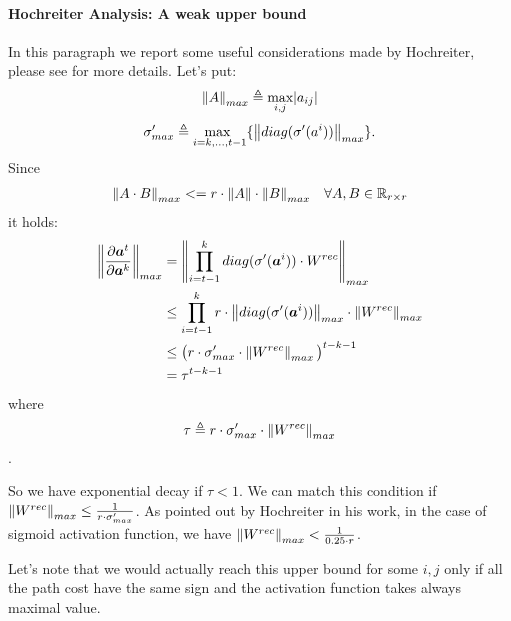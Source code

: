 \paragraph{Hochreiter Analysis: A weak upper bound}
In this paragraph we report some useful considerations made by Hochreiter, please see \cite{lstm} for more details.
Let's put:
$$\left\Vert A \right\Vert_{max}\triangleq \underset{i,j}{\text{max}}|a_{ij}| $$
$$\sigma'_{max} \triangleq \underset{i=k,...,t-1}{\text{max  }} \{\left\Vert diag(\sigma'(a^i)) \right\Vert_{max}\}.$$
Since
\begin{align}
\left\Vert A\cdot B \right\Vert_{max} &<= r \cdot \left\Vert A \right\Vert\cdot \left\Vert B \right\Vert_{max} & \forall A,B \in \mathbb{R}_{r\times r} 
\end{align}
it holds:
\begin{align}
\left\Vert \frac{\partial \boldsymbol{a}^t}{\partial \boldsymbol{a}^k} \right\Vert_{max} &= \left\Vert  \prod_{i=t-1}^{k}  diag(\sigma'(\boldsymbol{a}^i)) \cdot W^{rec}  \right\Vert_{max}\\
&\leq \prod_{i=t-1}^{k} r \cdot \left\Vert diag(\sigma'(\boldsymbol{a}^i)) \right\Vert_{max} \cdot \left\Vert W^{rec} \right\Vert_{max}\\
&\leq \big(r \cdot \sigma'_{max} \cdot \left\Vert W^{rec} \right\Vert_{max}\big)^{t-k-1} \\
&= \tau^{t-k-1}
\end{align}
where $$\tau \triangleq r \cdot \sigma'_{max} \cdot \left\Vert W^{rec} \right\Vert_{max}$$.

So we have exponential decay if $\tau<1$. We can match this condition if $\left\Vert W^{rec} \right\Vert_{max} \leq \frac{1}{r\cdot \sigma'_{max}}$.
As pointed out by Hochreiter in his work, in the case of sigmoid activation function, we have $\left\Vert W^{rec} \right\Vert_{max} < \frac{1}{0.25 \cdot r}$.

Let's note that we would actually reach this upper bound for some $i,j$ only if all the path cost have the same sign and the activation function takes always maximal
value.


